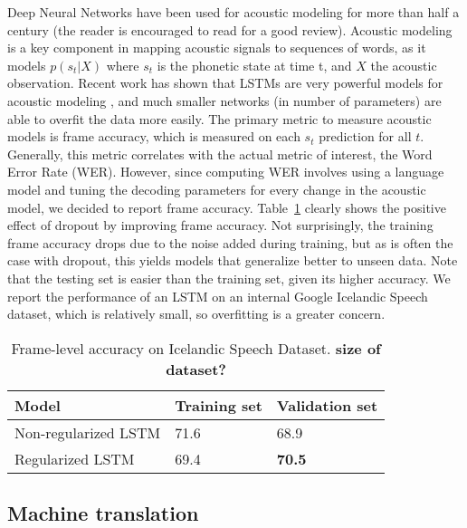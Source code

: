 \documentclass{article}
\begin{document}
Deep Neural Networks have been used for acoustic modeling for more
than half a century (the reader is encouraged to read
\cite{BourlardASR} for a good review). Acoustic modeling is a key
component in mapping acoustic signals to sequences of words, as it
models $p(s_t|X)$ where $s_t$ is the phonetic state at time t, and $X$
the acoustic observation. Recent work has shown that LSTMs are very
powerful models for acoustic modeling \cite{sak2014speech}, and much
smaller networks (in number of parameters) are able to overfit the
data more easily. The primary metric to measure acoustic models is
frame accuracy, which is measured on each $s_t$ prediction for all
$t$. Generally, this metric correlates with the actual metric of
interest, the Word Error Rate (WER). However, since computing WER
involves using a language model and tuning the decoding parameters for
every change in the acoustic model, we decided to report frame
accuracy. Table~\ref{tab:speech} clearly shows the positive effect of
dropout by improving frame accuracy. Not surprisingly, the training
frame accuracy drops due to the noise added during training, but as is
often the case with dropout, this yields models that generalize better
to unseen data. Note that the testing set is easier than the training
set, given its higher accuracy.  We report the performance of an LSTM
on an internal Google Icelandic Speech dataset, which is relatively
small, so overfitting is a greater concern. 

\begin{table}[t]
  \small
  \centering
  \renewcommand{\arraystretch}{1.15}
  \begin{tabular}{lll}
    \hline
     Model & Training set & Validation set \\
    \hline
    Non-regularized LSTM & 71.6 & 68.9 \\
    Regularized LSTM & 69.4 & {\bf 70.5} \\
    \hline
  \end{tabular}
  \caption{Frame-level accuracy on Icelandic Speech Dataset. {\bf size of dataset?}}
  \label{tab:speech}
\end{table}


\subsection{Machine translation}
\label{sec:trans}
\end{document}
